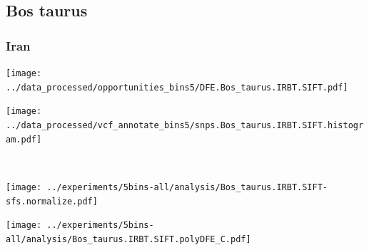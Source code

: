 \subsection{Bos taurus}

\subsubsection{Iran}

\begin{minipage}{0.49\linewidth}
    \texttt{[image: ../data\_processed/opportunities\_bins5/DFE.Bos\_taurus.IRBT.SIFT.pdf]}
\end{minipage}
\begin{minipage}{0.49\linewidth}
    \texttt{[image: ../data\_processed/vcf\_annotate\_bins5/snps.Bos\_taurus.IRBT.SIFT.histogram.pdf]}
\end{minipage}
\\
\begin{minipage}{0.49\linewidth}
    \texttt{[image: ../experiments/5bins-all/analysis/Bos\_taurus.IRBT.SIFT-sfs.normalize.pdf]}
\end{minipage}
\begin{minipage}{0.4\linewidth}
    \texttt{[image: ../experiments/5bins-all/analysis/Bos\_taurus.IRBT.SIFT.polyDFE\_C.pdf]}
\end{minipage}
